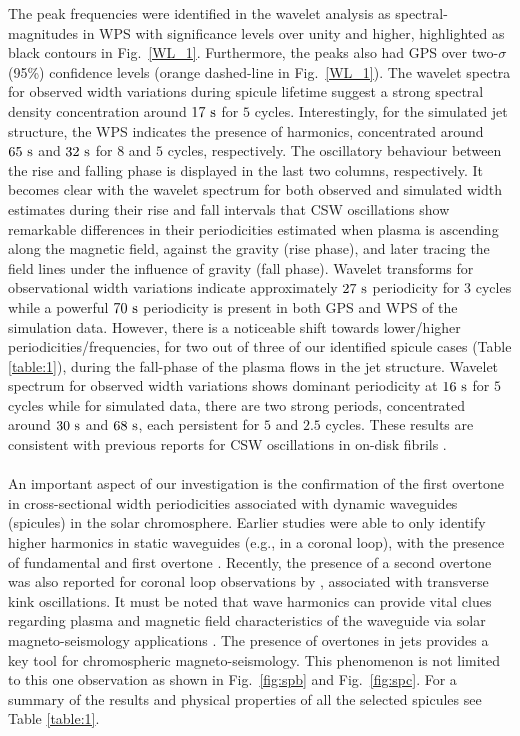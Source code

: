 \documentclass[12pt]{ociamthesis}
\newcommand{\np}{\\ \\}
\begin{document}
The peak frequencies were identified in the wavelet analysis as spectral-magnitudes in WPS with significance levels over unity and higher, highlighted as black contours in Fig.~\ref{WL_1}. Furthermore, the peaks also had GPS over two-$\sigma$ (95\%) confidence levels (orange dashed-line in Fig.~\ref{WL_1}). The wavelet spectra for observed width variations during spicule lifetime suggest a strong spectral density concentration around $17~\rm{s}$ for $5$ cycles. Interestingly, for the simulated jet structure, the WPS indicates the presence of harmonics, concentrated around $65~\rm{s}$ and $32~\rm{s}$ for $8$ and $5$ cycles, respectively. The oscillatory behaviour between the rise and falling phase is displayed in the last two columns, respectively. It becomes clear with the wavelet spectrum for both observed and simulated width estimates during their rise and fall intervals that CSW oscillations show remarkable differences in their periodicities estimated when plasma is ascending along the magnetic field, against the gravity (rise phase), and later tracing the field lines under the influence of gravity (fall phase). Wavelet transforms for observational width variations indicate approximately $27~\rm{s}$ periodicity for 3 cycles while a powerful $70~\rm{s}$ periodicity is present in both GPS and WPS of the simulation data. However, there is a noticeable shift towards lower/higher periodicities/frequencies, for two out of three of our identified spicule cases (Table \ref{table:1}), during the fall-phase of the plasma flows in the jet structure. Wavelet spectrum for observed width variations shows dominant periodicity at $16~\rm{s}$ for $5$ cycles while for simulated data, there are two strong periods, concentrated around $30~\rm{s}$ and $68~\rm{s}$, each persistent for $5$ and $2.5$ cycles. These results are consistent with previous reports for CSW oscillations in on-disk fibrils \citep{Gafeira2017}. \np
%
An important aspect of our investigation is the confirmation of the first overtone in cross-sectional width periodicities associated with dynamic waveguides (spicules) in the solar chromosphere.  Earlier studies were able to only identify higher harmonics in static waveguides (e.g., in a coronal loop), with the presence of fundamental and first overtone \citep{verwichte2004, guo2015}. Recently, the presence of a second overtone was also reported for coronal loop observations by \citet{duckenfield2019}, associated with transverse kink oscillations. It must be noted that wave harmonics can provide vital clues regarding plasma and magnetic field characteristics of the waveguide via solar magneto-seismology applications \citep{andries2005,andries2009}. The presence of overtones in jets provides a key tool for chromospheric magneto-seismology. This phenomenon is not limited to this one observation as shown in Fig.~\ref{fig:spb} and Fig.~\ref{fig:spc}. For a summary of the results and physical properties of all the selected spicules see Table \ref{table:1}. \np 
\end{document}
